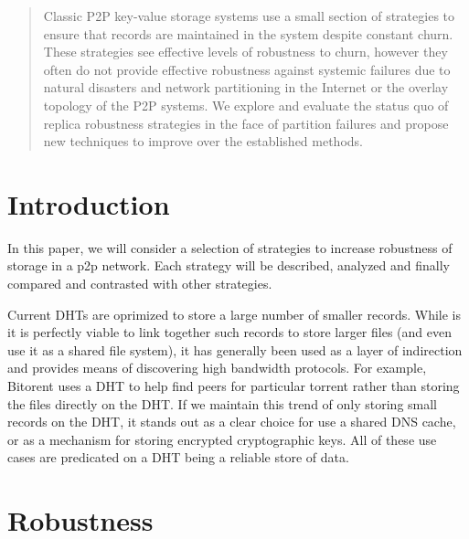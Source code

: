 





\begin{abstract}
Classic P2P key-value storage systems use a small section of strategies to ensure that records are maintained in the system despite constant churn.
These strategies see effective levels of robustness to churn, however they often do not provide effective robustness against systemic failures due to natural disasters and network partitioning in the Internet or the overlay topology of the P2P systems.
We explore and evaluate the status quo of replica robustness strategies in the face of partition failures and propose new techniques to improve over the established methods.
\end{abstract}



\section{Introduction}

In this paper, we will consider a selection of strategies to increase robustness of storage in a p2p network.
Each strategy will be described, analyzed and finally compared and contrasted with other strategies.


Current DHTs are oprimized to store a large number of smaller records.
While is it is perfectly viable to link together such records to store larger files (and even use it as a shared file system), it has generally been used as a layer of indirection and provides means of discovering high bandwidth protocols. For example, Bitorent uses a DHT to help find peers for particular torrent rather than storing the files directly on the DHT.
If we maintain this trend of only storing small records on the DHT, it stands out as a clear choice for use a shared DNS cache, or as a mechanism for storing encrypted cryptographic keys.
All of these  use cases are predicated on a DHT being a reliable store of data.

\section{Robustness}

